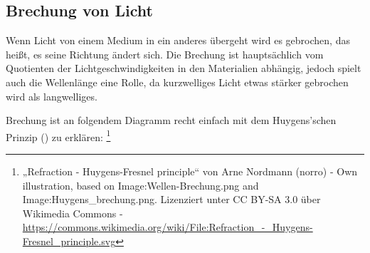 




%
%	






\subsection{Brechung von Licht}

Wenn Licht von einem Medium in ein anderes übergeht wird es gebrochen, das heißt, es seine Richtung ändert sich. Die Brechung ist hauptsächlich vom Quotienten der Lichtgeschwindigkeiten in den Materialien abhängig, jedoch spielt auch die Wellenlänge eine Rolle, da kurzwelliges Licht etwas stärker gebrochen wird als langwelliges.

Brechung ist an folgendem Diagramm recht einfach mit dem Huygens'schen Prinzip () zu erklären: \footnote{„Refraction - Huygens-Fresnel principle“ von Arne Nordmann (norro) - Own illustration, based on Image:Wellen-Brechung.png and Image:Huygens\_brechung.png. Lizenziert unter CC BY-SA 3.0 über Wikimedia Commons - \url{https://commons.wikimedia.org/wiki/File:Refraction\_-\_Huygens-Fresnel\_principle.svg}}

